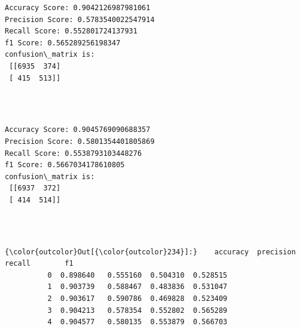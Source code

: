 \documentclass[11pt]{article}
\begin{document}
    \begin{Verbatim}[commandchars=\\\{\}]
Accuracy Score: 0.9042126987981061
Precision Score: 0.5783540022547914
Recall Score: 0.552801724137931
f1 Score: 0.565289256198347
confusion\_matrix is: 
 [[6935  374]
 [ 415  513]] 


    \end{Verbatim}


    \begin{center}
    \end{center}
    { \hspace*{\fill} \\}
    
   

    \begin{Verbatim}[commandchars=\\\{\}]
Accuracy Score: 0.9045769090688357
Precision Score: 0.5801354401805869
Recall Score: 0.5538793103448276
f1 Score: 0.5667034178610805
confusion\_matrix is: 
 [[6937  372]
 [ 414  514]] 


    \end{Verbatim}

   

    \begin{center}
    \end{center}
    { \hspace*{\fill} \\}
    
\begin{Verbatim}[commandchars=\\\{\}]
{\color{outcolor}Out[{\color{outcolor}234}]:}    accuracy  precision    recall        f1
          0  0.898640   0.555160  0.504310  0.528515
          1  0.903739   0.588467  0.483836  0.531047
          2  0.903617   0.590786  0.469828  0.523409
          3  0.904213   0.578354  0.552802  0.565289
          4  0.904577   0.580135  0.553879  0.566703
\end{Verbatim}
            
    \begin{center}
    \end{center}
    { \hspace*{\fill} \\}
    
\end{document}
